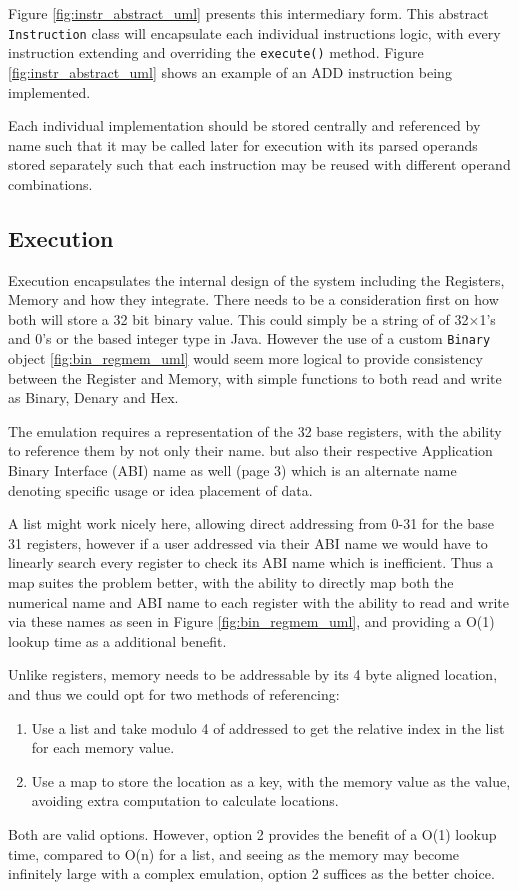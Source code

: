 Figure \ref{fig:instr_abstract_uml} presents this intermediary form. This abstract \texttt{Instruction} class will encapsulate each individual instructions logic, with every instruction extending and overriding the \verb|execute()| method. Figure \ref{fig:instr_abstract_uml} shows an example of an ADD instruction being implemented.

Each individual implementation should be stored centrally and referenced by name such that it may be called later for execution with its parsed operands stored separately such that each instruction may be reused with different operand combinations.


\subsection{Execution}
Execution encapsulates the internal design of the system including the Registers, Memory and how they integrate. There needs to be a consideration first on how both will store a 32 bit binary value. This could simply be a string of of 32$\times$1's and 0's or the based integer type in Java. However the use of a custom \texttt{Binary} object \ref{fig:bin_regmem_uml} would seem more logical to provide consistency between the Register and Memory, with simple functions to both read and write as Binary, Denary and Hex.

The emulation requires a representation of the 32 base registers, with the ability to reference them by not only their name. but also their respective Application Binary Interface (ABI) name as well \cite{riscvinternational_2014_calling}(page 3) which is an alternate name denoting specific usage or idea placement of data. 

A list might work nicely here, allowing direct addressing from 0-31 for the base 31 registers, however if a user addressed via their ABI name we would have to linearly search every register to check its ABI name which is inefficient. Thus a map suites the problem better, with the ability to directly map both the numerical name and ABI name to each register with the ability to read and write via these names as seen in Figure \ref{fig:bin_regmem_uml}, and providing a O(1) lookup time as a additional benefit.

Unlike registers, memory needs to be addressable by its 4 byte aligned location, and thus we could opt for two methods of referencing:
\begin{enumerate}
    \item Use a list and take modulo 4 of addressed to get the relative index in the list for each memory value.
    \item Use a map to store the location as a key, with the memory value as the value, avoiding extra computation to calculate locations.
\end{enumerate}
Both are valid options. However, option 2 provides the benefit of a O(1) lookup time, compared to O(n) for a list, and seeing as the memory may become infinitely large with a complex emulation, option 2 suffices as the better choice.

